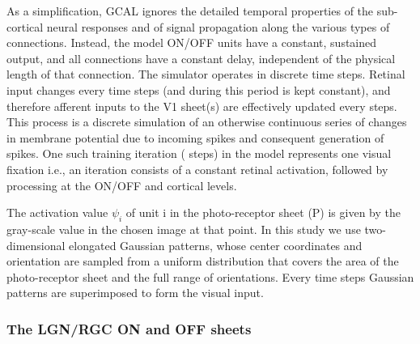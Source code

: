 \documentclass[utf8]{frontiersSCNS}
\begin{document}
As a simplification, GCAL ignores the detailed temporal properties of the sub-cortical neural responses and of signal propagation along the various types of connections. Instead, the model ON/OFF units have a constant, sustained output, and all connections have a constant delay, independent of the physical length of that connection. The simulator operates in discrete time steps. Retinal input changes every  time steps (and during this period is kept constant), and therefore afferent inputs to the V1 sheet(s) are effectively updated every  steps. This process is a discrete simulation of an otherwise continuous series of changes in membrane potential due to incoming spikes and consequent generation of spikes. One such training iteration ( steps) in the model represents one visual fixation i.e., an iteration consists of a constant retinal activation, followed by processing at the ON/OFF and cortical levels.

The activation value $\psi_{i}$ of unit i in the photo-receptor sheet (P) is given by the gray-scale value in the chosen image at that point.
In this study we use two-dimensional elongated Gaussian patterns, whose center coordinates and orientation are sampled from a uniform 
distribution that covers the area of the photo-receptor sheet and the full range of orientations. Every  time steps  Gaussian patterns are superimposed to form the visual input.

\subsubsection{The LGN/RGC ON and OFF sheets}
\end{document}
